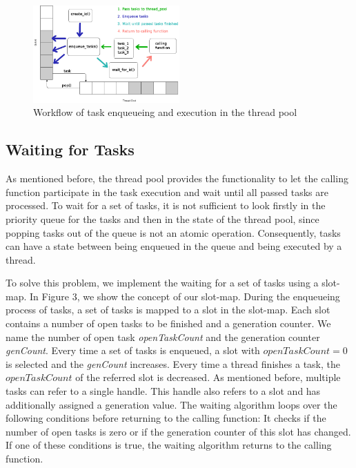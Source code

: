 \documentclass[conference]{IEEEtran}
\begin{document}
\begin{figure}
	\includegraphics[width=0.5\textwidth]{img/pool_queue.png}
	\caption{Workflow of task enqueueing and execution in the thread pool}
	\label{fig1}
\end{figure}

\subsection{Waiting for Tasks}
As mentioned before, the thread pool provides the functionality to let the calling function participate in the task execution and wait until all passed tasks are processed. To wait for a set of tasks, it is not sufficient to look firstly in the priority queue for the tasks and then in the state of the thread pool, since popping tasks out of the queue is not an atomic operation. Consequently, tasks can have a state between being enqueued in the queue and being executed by a thread.

To solve this problem, we implement the waiting for a set of tasks using a slot-map. In Figure 3, we show the concept of our slot-map. During the enqueueing process of tasks, a set of tasks is mapped to a slot in the slot-map. Each slot contains a number of open tasks to be finished and a generation counter. We name the number of open task \emph{openTaskCount} and the generation counter \emph{genCount}. Every time a set of tasks is enqueued, a slot with $openTaskCount = 0$ is selected and the \emph{genCount} increases. Every time a thread finishes a task, the $openTaskCount$ of the referred slot is decreased. As mentioned before, multiple tasks can refer to a single handle. This handle also refers to a slot and has additionally assigned a generation value. The waiting algorithm loops over the following conditions before returning to the calling function: It checks if the number of open tasks is zero or if the generation counter of this slot has changed. If one of these conditions is true, the waiting algorithm returns to the calling function.
\end{document}

